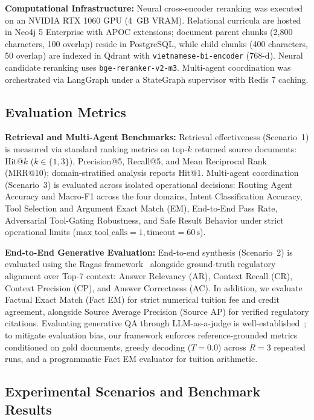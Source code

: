 \noindent\textbf{Computational Infrastructure:} Neural cross-encoder reranking was executed on an NVIDIA RTX 1060 GPU (4~GB VRAM). Relational curricula are hosted in Neo4j 5 Enterprise with APOC extensions; document parent chunks (2,800 characters, 100 overlap) reside in PostgreSQL, while child chunks (400 characters, 50 overlap) are indexed in Qdrant with \texttt{vietnamese-bi-encoder} (768-d). Neural candidate reranking uses \texttt{bge-reranker-v2-m3}. Multi-agent coordination was orchestrated via LangGraph under a StateGraph supervisor with Redis 7 caching.

\subsection{Evaluation Metrics}
\label{sec:metrics}

\noindent\textbf{Retrieval and Multi-Agent Benchmarks:} Retrieval effectiveness (Scenario~1) is measured via standard ranking metrics on top-$k$ returned source documents: Hit@$k$ ($k \in \{1, 3\}$), Precision@5, Recall@5, and Mean Reciprocal Rank (MRR@10); domain-stratified analysis reports Hit@1. Multi-agent coordination (Scenario~3) is evaluated across isolated operational decisions: Routing Agent Accuracy and Macro-F1 across the four domains, Intent Classification Accuracy, Tool Selection and Argument Exact Match (EM), End-to-End Pass Rate, Adversarial Tool-Gating Robustness, and Safe Result Behavior under strict operational limits ($\text{max\_tool\_calls}=1, \text{timeout}=60\,\text{s}$).

\noindent\textbf{End-to-End Generative Evaluation:} End-to-end synthesis (Scenario~2) is evaluated using the Ragas framework~\cite{es2023ragas} alongside ground-truth regulatory alignment over Top-7 context: Answer Relevancy (AR), Context Recall (CR), Context Precision (CP), and Answer Correctness (AC). In addition, we evaluate Factual Exact Match (Fact EM) for strict numerical tuition fee and credit agreement, alongside Source Average Precision (Source AP) for verified regulatory citations. Evaluating generative QA through LLM-as-a-judge is well-established~\cite{zheng2023judging,es2023ragas}; to mitigate evaluation bias, our framework enforces reference-grounded metrics conditioned on gold documents, greedy decoding ($T\!=\!0.0$) across $R\!=\!3$ repeated runs, and a programmatic Fact EM evaluator for tuition arithmetic.

\subsection{Experimental Scenarios and Benchmark Results}
\label{sec:scenarios}


